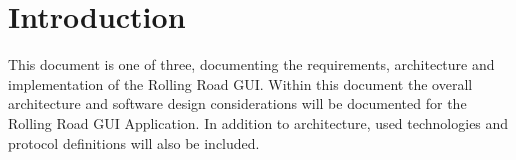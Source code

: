 \chapter{Introduction}

This document is one of three, documenting the requirements, architecture and implementation of the Rolling Road GUI. Within this document the overall architecture and software design considerations will be documented for the Rolling Road GUI Application. In addition to architecture, used technologies and protocol definitions will also be included.